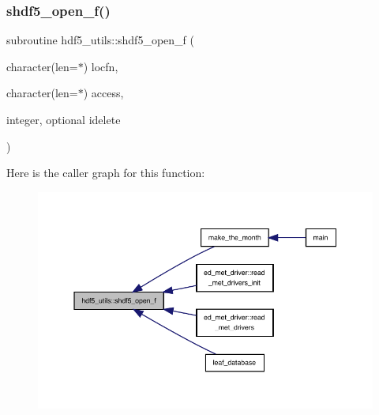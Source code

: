 \mbox{\label{namespacehdf5__utils_ab621eee22271edfd3bf37b44d5b657e6}} 
\subsubsection{\texorpdfstring{shdf5\+\_\+open\+\_\+f()}{shdf5\_open\_f()}}
{\footnotesize\ttfamily subroutine hdf5\+\_\+utils\+::shdf5\+\_\+open\+\_\+f (\begin{DoxyParamCaption}\item[{character(len=$\ast$)}]{locfn,  }\item[{character(len=$\ast$)}]{access,  }\item[{integer, optional}]{idelete }\end{DoxyParamCaption})}

Here is the caller graph for this function\+:
\nopagebreak
\begin{figure}[H]
\begin{center}
\leavevmode
\includegraphics[width=350pt]{namespacehdf5__utils_ab621eee22271edfd3bf37b44d5b657e6_icgraph}
\end{center}
\end{figure}
\mbox{\label{namespacehdf5__utils_a58ff5ab2483e4daa0dbed83d77252b07}} 
